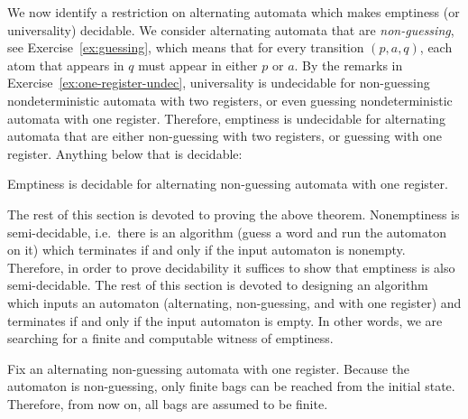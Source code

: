 We now identify a restriction on alternating automata which makes emptiness (or universality) decidable. 
We consider alternating automata that are \emph{non-guessing}, see Exercise~\ref{ex:guessing}, which means that for every transition $(p,a,q)$, each atom that appears in $q$ must appear in either $p$ or $a$. 
By the remarks in Exercise~\ref{ex:one-register-undec}, universality is undecidable for non-guessing nondeterministic automata with two registers, or even guessing nondeterministic automata with one register. Therefore, emptiness is undecidable for alternating automata that are either non-guessing with two registers, or guessing with one register. Anything below that is decidable:
 
 \begin{theorem}\label{thm:one-register-alternating}
 	Emptiness is decidable for alternating non-guessing automata with one register.
 \end{theorem}
 
 The rest of this section is devoted to proving the above theorem. Nonemptiness is semi-decidable, i.e.~there is an algorithm (guess a word and run the automaton on it) which terminates if and only if the input automaton is nonempty. Therefore, in order to prove decidability it suffices to show that emptiness is also semi-decidable. The rest of this section is devoted to designing an algorithm which inputs an automaton (alternating, non-guessing, and with one register) and terminates if and only if the input automaton is empty. In other words, we are searching for a finite and computable witness of emptiness. 

 Fix an alternating non-guessing automata with one register. Because the automaton is non-guessing, only finite bags can be reached from the initial state. Therefore, from now on, all bags are assumed to be finite.

